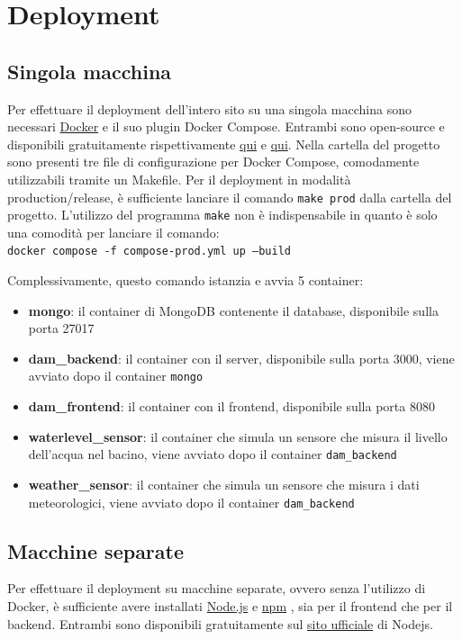 \documentclass[a4paper,12pt]{report}
\newcommand{\node}{\href{https://nodejs.org/it/}{Node.js} }
\newcommand{\npm}{\href{https://www.npmjs.com/}{npm} }
\newcommand{\docker}{\href{https://www.docker.com/}{Docker} }
\begin{document}
\clearpage
\chapter{Deployment}\label{sec:deployment}

\section{Singola macchina}
Per effettuare il deployment dell'intero sito su una singola macchina sono necessari \docker e il suo plugin Docker Compose. Entrambi sono open-source e disponibili gratuitamente rispettivamente \href{https://docs.docker.com/desktop/#download-and-install}{qui} e \href{https://docs.docker.com/compose/install/}{qui}. Nella cartella del progetto sono presenti tre file di configurazione per Docker Compose, comodamente utilizzabili tramite un Makefile. Per il deployment in modalità production/release, è sufficiente lanciare il comando \texttt{make prod} dalla cartella del progetto. L'utilizzo del programma \texttt{make} non è indispensabile in quanto è solo una comodità per lanciare il comando:\\
\texttt{docker compose -f compose-prod.yml up --build}

Complessivamente, questo comando istanzia e avvia 5 container:
\begin{itemize}
	\item \textbf{mongo}: il container di MongoDB contenente il database, disponibile sulla porta 27017
	\item \textbf{dam\_backend}: il container con il server, disponibile sulla porta 3000, viene avviato dopo il container \texttt{mongo}
	\item \textbf{dam\_frontend}: il container con il frontend, disponibile sulla porta 8080
	\item \textbf{waterlevel\_sensor}: il container che simula un sensore che misura il livello dell'acqua nel bacino, viene avviato dopo il container \texttt{dam\_backend}
	\item \textbf{weather\_sensor}: il container che simula un sensore che misura i dati meteorologici, viene avviato dopo il container \texttt{dam\_backend}
\end{itemize}

\section{Macchine separate}
Per effettuare il deployment su macchine separate, ovvero senza l'utilizzo di Docker, è sufficiente avere installati \node e \npm, sia per il frontend che per il backend. Entrambi sono disponibili gratuitamente sul \href{https://nodejs.org/it/download/}{sito ufficiale} di Nodejs.
\end{document}
